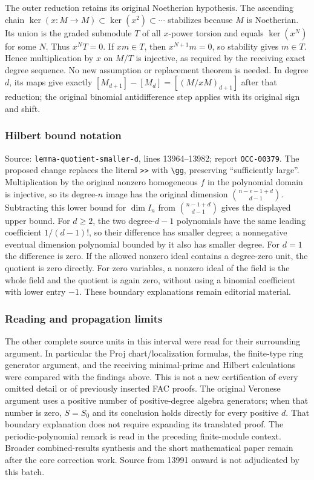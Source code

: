 The outer reduction retains its original Noetherian hypothesis. The ascending chain \(\ker(x:M\to M)\subset\ker(x^2)\subset\cdots\) stabilizes because \(M\) is Noetherian. Its union is the graded submodule \(T\) of all \(x\)-power torsion and equals \(\ker(x^N)\) for some \(N\). Thus \(x^NT=0\). If \(xm\in T\), then \(x^{N+1}m=0\), so stability gives \(m\in T\). Hence multiplication by \(x\) on \(M/T\) is injective, as required by the receiving exact degree sequence. No new assumption or replacement theorem is needed. In degree \(d\), its maps give exactly \([M_{d+1}]-[M_d]=[(M/xM)_{d+1}]\) after that reduction; the original binomial antidifference step applies with its original sign and shift.

\subsubsection{Hilbert bound notation}\label{algebra-proof-002-hilbert-bound-notation}

Source: \texttt{lemma-quotient-smaller-d}, lines 13964--13982; report \texttt{OCC-00379}. The proposed change replaces the literal \texttt{\textgreater{}\textgreater{}} with \texttt{\textbackslash{}gg}, preserving ``sufficiently large''. Multiplication by the original nonzero homogeneous \(f\) in the polynomial domain is injective, so its degree-\(n\) image has the original dimension \(\binom{n-e-1+d}{d-1}\). Subtracting this lower bound for \(\dim I_n\) from \(\binom{n-1+d}{d-1}\) gives the displayed upper bound. For \(d\geq2\), the two degree-\(d-1\) polynomials have the same leading coefficient \(1/(d-1)!\), so their difference has smaller degree; a nonnegative eventual dimension polynomial bounded by it also has smaller degree. For \(d=1\) the difference is zero. If the allowed nonzero ideal contains a degree-zero unit, the quotient is zero directly. For zero variables, a nonzero ideal of the field is the whole field and the quotient is again zero, without using a binomial coefficient with lower entry \(-1\). These boundary explanations remain editorial material.

\subsubsection{Reading and propagation limits}\label{algebra-proof-002-reading-and-propagation-limits}

The other complete source units in this interval were read for their surrounding argument. In particular the Proj chart/localization formulas, the finite-type ring generator argument, and the receiving minimal-prime and Hilbert calculations were compared with the findings above. This is not a new certification of every omitted detail or of previously inserted FAC proofs. The original Veronese argument uses a positive number of positive-degree algebra generators; when that number is zero, \(S=S_0\) and its conclusion holds directly for every positive \(d\). That boundary explanation does not require expanding its translated proof. The periodic-polynomial remark is read in the preceding finite-module context. Broader combined-results synthesis and the short mathematical paper remain after the core correction work. Source from 13991 onward is not adjudicated by this batch.
